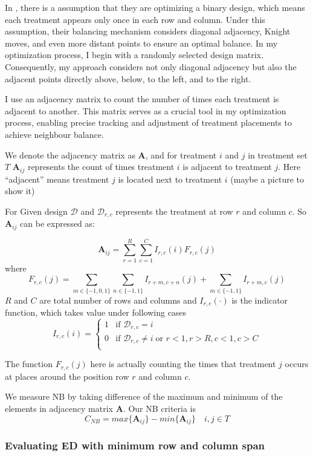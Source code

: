 \documentclass[
  a4paper,
  oneside,
  openany,
  12pt,
  onecolumn]{book}
\theoremstyle{definition}
\theoremstyle{plain}
\theoremstyle{remark}
\begin{document}
In \citet{piepho2018neighbor}, there is a assumption that they are
optimizing a binary design, which means each treatment appears only once
in each row and column. Under this assumption, their balancing mechanism
considers diagonal adjacency, Knight moves, and even more distant points
to ensure an optimal balance. In my optimization process, I begin with a
randomly selected design matrix. Consequently, my approach considers not
only diagonal adjacency but also the adjacent points directly above,
below, to the left, and to the right.

I use an adjacency matrix to count the number of times each treatment is
adjacent to another. This matrix serves as a crucial tool in my
optimization process, enabling precise tracking and adjustment of
treatment placements to achieve neighbour balance.

We denote the adjacency matrix as \(\boldsymbol{A}\), and for treatment
\(i\) and \(j\) in treatment set \(T\) \(\boldsymbol{A}_{ij}\)
represents the count of times treatment \(i\) is adjacent to treatment
\(j\). Here ``adjacent'' means treatment \(j\) is located next to
treatment \(i\) (maybe a picture to show it)

For Given design \(\mathcal{D}\) and \(\mathcal{D}_{r,c}\) represents
the treatment at row \(r\) and column \(c\). So \(\boldsymbol{A}_{ij}\)
can be expressed as:

\[
\boldsymbol{A}_{ij}=\sum_{r=1}^{R}\sum_{c=1}^{C}I_{r,c}(i) F_{r,c}(j)
\] where \[
F_{r,c}(j)=
\sum_{m \in \{-1,0,1\}}\sum_{n \in \{-1,1\}}I_{r+m,c+n}(j)+\sum_{m \in \{-1,1\}}I_{r+m,c}(j)
\] \(R\) and \(C\) are total number of rows and columns and
\(I_{r,c}(\cdot)\) is the indicator function, which takes value under
following cases \[
I_{r,c}(i)=
\begin{cases}
1 & \text{if } \mathcal{D}_{r,c}=i \\
0 & \text{if } \mathcal{D}_{r,c}\neq i \; \text{or } r<1,r>R,c<1,c>C\\
\end{cases}
\]

The function \(F_{r,c}(j)\) here is actually counting the times that
treatment \(j\) occurs at places around the position row \(r\) and
column \(c\).

We measure NB by taking difference of the maximum and minimum of the
elements in adjacency matrix \(\boldsymbol{A}\). Our NB criteria is \[
C_{NB}=max\{\boldsymbol{A}_{ij}\}-min\{\boldsymbol{A}_{ij}\}  \quad i,j\in T
\]

\subsubsection{Evaluating ED with minimum row and column
span}\label{evaluating-ed-with-minimum-row-and-column-span}
\end{document}
